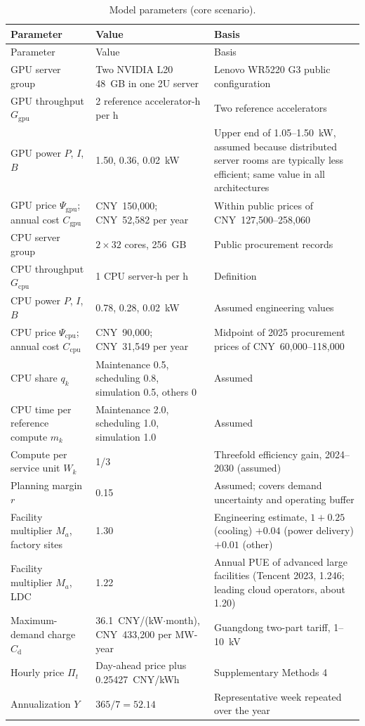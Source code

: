 \documentclass[11pt]{article}
\newcommand{\cny}{CNY~}
\begin{document}
{\small
\begin{longtable}{@{}L{0.30\textwidth}L{0.27\textwidth}L{0.37\textwidth}@{}}
\caption{Model parameters (core scenario).}\label{tab:params}\\
\toprule
Parameter & Value & Basis \\
\midrule
\endfirsthead
\toprule
Parameter & Value & Basis \\
\midrule
\endhead
\bottomrule
\endfoot
GPU server group & Two NVIDIA L20 48~GB in one 2U server & Lenovo WR5220 G3 public configuration \\
GPU throughput $G_{\mathrm{gpu}}$ & 2 reference accelerator-h per h & Two reference accelerators \\
GPU power $P$, $I$, $B$ & 1.50, 0.36, 0.02~kW & Upper end of 1.05--1.50~kW, assumed because distributed server rooms are typically less efficient; same value in all architectures \\
GPU price $\Psi_{\mathrm{gpu}}$; annual cost $C_{\mathrm{gpu}}$ & \cny150,000; \cny52,582 per year & Within public prices of \cny127,500--258,060 \\
CPU server group & $2\times32$ cores, 256~GB & Public procurement records \\
CPU throughput $G_{\mathrm{cpu}}$ & 1 CPU server-h per h & Definition \\
CPU power $P$, $I$, $B$ & 0.78, 0.28, 0.02~kW & Assumed engineering values \\
CPU price $\Psi_{\mathrm{cpu}}$; annual cost $C_{\mathrm{cpu}}$ & \cny90,000; \cny31,549 per year & Midpoint of 2025 procurement prices of \cny60,000--118,000 \\
CPU share $q_k$ & Maintenance 0.5, scheduling 0.8, simulation 0.5, others 0 & Assumed \\
CPU time per reference compute $m_k$ & Maintenance 2.0, scheduling 1.0, simulation 1.0 & Assumed \\
Compute per service unit $W_k$ & 1/3 & Threefold efficiency gain, 2024--2030 (assumed) \\
Planning margin $r$ & 0.15 & Assumed; covers demand uncertainty and operating buffer \\
Facility multiplier $M_a$, factory sites & 1.30 & Engineering estimate, $1+0.25$ (cooling) $+0.04$ (power delivery) $+0.01$ (other) \\
Facility multiplier $M_a$, LDC & 1.22 & Annual PUE of advanced large facilities (Tencent 2023, 1.246; leading cloud operators, about 1.20) \\
Maximum-demand charge $C_{\mathrm{d}}$ & 36.1~CNY/(kW$\cdot$month), \cny433,200 per MW-year & Guangdong two-part tariff, 1--10~kV \\
Hourly price $\Pi_t$ & Day-ahead price plus 0.25427~CNY/kWh & Supplementary Methods 4 \\
Annualization $Y$ & $365/7=52.14$ & Representative week repeated over the year \\
\end{longtable}}
\end{document}
